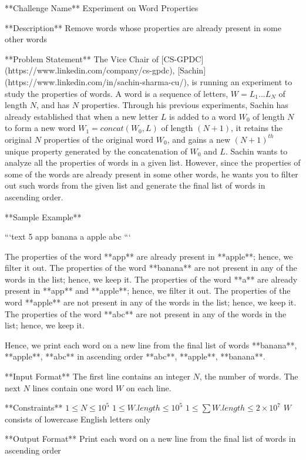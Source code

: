 **Challenge Name**  
Experiment on Word Properties

**Description**  
Remove words whose properties are already present in some other words

**Problem Statement**  
The Vice Chair of [CS-GPDC](https://www.linkedin.com/company/cs-gpdc), [Sachin](https://www.linkedin.com/in/sachin-sharma-cu/), is running an experiment to study the properties of words. A word is a sequence of letters, $W = L_1 ... L_N$ of length $N$, and has $N$ properties. Through his previous experiments, Sachin has already established that when a new letter $L$ is added to a word $W_0$ of length $N$ to form a new word $W_1 = concat(W_0, L)$ of length $(N+1)$, it retains the original $N$ properties of the original word $W_0$, and gains a new $(N+1)^{th}$ unique property generated by the concatenation of $W_0$ and $L$. Sachin wants to analyze all the properties of words in a given list. However, since the properties of some of the words are already present in some other words, he wants you to filter out such words from the given list and generate the final list of words in ascending order.

**Sample Example**  

```text
5
app
banana
a
apple
abc
```

The properties of the word **app** are already present in **apple**; hence, we filter it out.  
The properties of the word **banana** are not present in any of the words in the list; hence, we keep it.  
The properties of the word **a** are already present in **app** and **apple**; hence, we filter it out.  
The properties of the word **apple** are not present in any of the words in the list; hence, we keep it.  
The properties of the word **abc** are not present in any of the words in the list; hence, we keep it.  

Hence, we print each word on a new line from the final list of words {**banana**, **apple**, **abc**} in ascending order {**abc**, **apple**, **banana**}.

**Input Format**  
The first line contains an integer $N$, the number of words.  
The next $N$ lines contain one word $W$ on each line.

**Constraints**  
$1 \leq N \leq 10^5$  
$1 \leq W.length \leq 10^5$  
$1 \leq \sum W.length \leq 2 \times 10^7$  
$W$ consists of lowercase English letters only  

**Output Format**  
Print each word on a new line from the final list of words in ascending order
